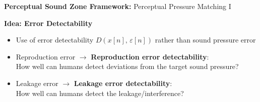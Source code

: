 \documentclass[aspectratio=169]{beamer}
\begin{document}
\begin{frame}{\textbf{Perceptual Sound Zone Framework:} Perceptual Pressure Matching I}
    \begin{block}{\textbf{Idea: Error Detectability}}
        \begin{itemize}
            \item Use of error detectability $D(x[n],\,\varepsilon[n])$ rather than sound pressure error
            \vspace{3pt}
            \item Reproduction error $\rightarrow$ \textbf{Reproduction error detectability}:\\
                How well can humans detect deviations from the target sound pressure?
            \vspace{3pt}
            \item Leakage error $\rightarrow$ \textbf{Leakage error detectability}:\\
                How well can humans detect the leakage/interference?
            \vspace{3pt}
        \end{itemize}
        
    \end{block}
\end{frame}

\end{document}
